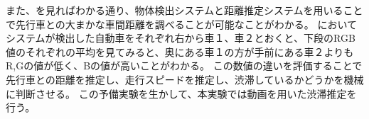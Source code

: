 また、を見ればわかる通り、物体検出システムと距離推定システムを用いることで先行車との大まかな車間距離を調べることが可能なことがわかる。
においてシステムが検出した自動車をそれぞれ右から車１、車２とおくと、下段のRGB値のそれぞれの平均を見てみると、奥にある車１の方が手前にある車２よりもR,Gの値が低く、Bの値が高いことがわかる。
この数値の違いを評価することで先行車との距離を推定し、走行スピードを推定し、渋滞しているかどうかを機械に判断させる。
この予備実験を生かして、本実験では動画を用いた渋滞推定を行う。
